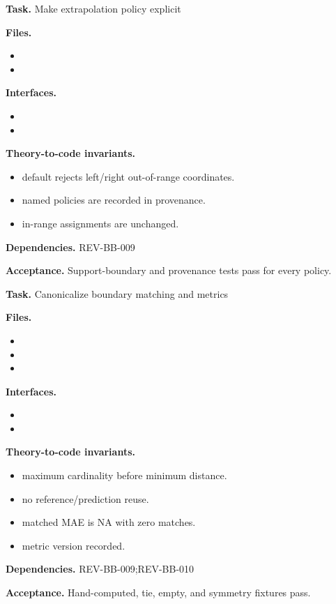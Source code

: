 \begin{statusbox}[CODE-BB-007]
\textbf{Task.} Make extrapolation policy explicit\par
\textbf{Files.}
\begin{itemize}[leftmargin=1.7em,itemsep=1.5pt,topsep=2pt]
\item {}
\item {}
\end{itemize}
\textbf{Interfaces.}
\begin{itemize}[leftmargin=1.7em,itemsep=1.5pt,topsep=2pt]
\item {}
\item {}
\end{itemize}
\textbf{Theory-to-code invariants.}
\begin{itemize}[leftmargin=1.7em,itemsep=1.5pt,topsep=2pt]
\item default rejects left/right out-of-range coordinates.
\item named policies are recorded in provenance.
\item in-range assignments are unchanged.
\end{itemize}
\textbf{Dependencies.} REV-BB-009\par
\textbf{Acceptance.} Support-boundary and provenance tests pass for every policy.
\end{statusbox}

\begin{statusbox}[CODE-BB-008]
\textbf{Task.} Canonicalize boundary matching and metrics\par
\textbf{Files.}
\begin{itemize}[leftmargin=1.7em,itemsep=1.5pt,topsep=2pt]
\item {}
\item {}
\item {}
\end{itemize}
\textbf{Interfaces.}
\begin{itemize}[leftmargin=1.7em,itemsep=1.5pt,topsep=2pt]
\item {}
\item {}
\end{itemize}
\textbf{Theory-to-code invariants.}
\begin{itemize}[leftmargin=1.7em,itemsep=1.5pt,topsep=2pt]
\item maximum cardinality before minimum distance.
\item no reference/prediction reuse.
\item matched MAE is NA with zero matches.
\item metric version recorded.
\end{itemize}
\textbf{Dependencies.} REV-BB-009;REV-BB-010\par
\textbf{Acceptance.} Hand-computed, tie, empty, and symmetry fixtures pass.
\end{statusbox}

